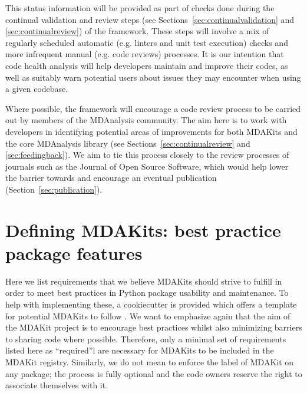 \documentclass[9pt,whitepaper]{livecoms}
\begin{document}
This status information will be provided as part of checks done during the continual validation and review steps (see Sections~\ref{sec:continualvalidation} and \ref{sec:continualreview}) of the framework. These steps will involve a mix of regularly scheduled automatic (e.g. linters and unit test execution) checks and more infrequent manual (e.g. code reviews) processes. It is our intention that code health analysis will help developers maintain and improve their codes, as well as suitably warn potential users about issues they may encounter when using a given codebase.

Where possible, the framework will encourage a code review process to be carried out by members of the MDAnalysis community. The aim here is to work with developers in identifying potential areas of improvements for both MDAKits and the core MDAnalysis library (see Sections~\ref{sec:continualreview} and \ref{sec:feedingback}). We aim to tie this process closely to the review processes of journals such as the Journal of Open Source Software, which would help lower the barrier towards and encourage an eventual publication (Section~\ref{sec:publication}).

\section{Defining MDAKits: best practice package features}
\label{sec:definitions}

Here we list requirements that we believe MDAKits should strive to fulfill in order to meet best practices in Python package usability and maintenance. To help with implementing these, a cookiecutter is provided which offers a template for potential MDAKits to follow \cite{wang_cookiecutter_nodate}. We want to emphasize again that the aim of the MDAKit project is to encourage best practices whilst also minimizing barriers to sharing code where possible. Therefore, only a minimal set of requirements listed here as “required”l are necessary for MDAKits to be included in the MDAKit registry. Similarly, we do not mean to enforce the label of MDAKit on any package; the process is fully optional and the code owners reserve the right to associate themselves with it.
\end{document}
